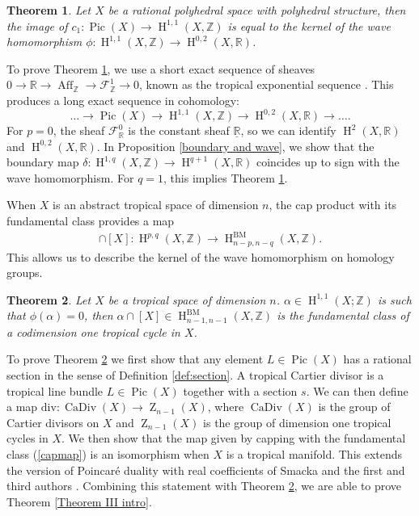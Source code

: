 \documentclass[11pt]{article}
\numberwithin{equation}{numsection}
\newcommand{\Z}{{\mathbb Z}}
\newcommand{\R}{{\mathbb R}}
\newcommand{\F}{{\mathcal F}}
\renewcommand{\div}{\mathrm{div}}
\DeclareMathOperator{\Pic}{Pic}
\DeclareMathOperator{\Aff}{Aff}
\DeclareMathOperator{\BM}{BM}
\DeclareMathOperator{\Div}{CaDiv}
\DeclareMathOperator{\HH}{H}
\DeclareMathOperator{\ZY}{Z}
\newtheorem{thm}{Theorem}[section]
\begin{document}
\begin{thm} \label{Theorem I intro}
Let $X$ be a  rational polyhedral space with polyhedral structure, then  the  image of $c_1 \colon \Pic(X) \rightarrow \HH^{1, 1}(X, \mathbb{Z})$ is equal to 
the kernel of the wave homomorphism 
$\phi \colon \HH^{1, 1}(X, \mathbb{Z})  \to \HH^{0,2}(X, \R)$. 
\end{thm}


To prove Theorem \ref{Theorem I intro},  we use a short exact sequence of sheaves $0 \to \R \to \Aff_{\Z} \to \F^1_{\Z} \to 0$, known as the tropical exponential sequence \cite{MikZha:Theta}. This produces a long exact sequence in cohomology: 
$$ \dots \to \Pic(X) \rightarrow \HH^{1, 1}(X, \mathbb{Z}) \to \HH^{0,2}(X, \R) \to \dots . $$
For $p = 0$, the sheaf $\mathcal{F}^0_{\R}$ is the constant sheaf $\underline{\R}$, 
so we can identify $\HH^{2}(X, \R)$ and $\HH^{0, 2}(X, \mathbb{R})$. 
In Proposition \ref{boundary and wave}, we show that the boundary map $\delta \colon  \HH^{1, q}(X, \mathbb{Z}) \to \HH^{q+1}(X, \R)$
coincides up to sign with the wave homomorphism. For $q=1$, this implies Theorem \ref{Theorem I intro}.


When $X$ is an abstract tropical space of dimension $n$, the cap product with its fundamental class provides  a map
\begin{align}\label{capmap}
\cap [X] \colon \HH^{p,q}(X, \Z) \to \HH^{\BM}_{n-p,n-q}(X, \Z).
\end{align}
This allows us to describe the kernel of the wave homomorphism on homology groups. 

\begin{thm} \label{Theorem II intro}
Let $X$ be a tropical space of dimension $n$. 
$\alpha \in \HH^{1, 1}(X; \mathbb{Z})$ is  such that $\phi(\alpha) = 0$, 
then $\alpha \cap [X] \in \HH^{\BM}_{n-1, n-1}(X, \Z)$ is the fundamental class of a codimension one tropical cycle in $X$. 
\end{thm}




To prove Theorem \ref{Theorem II intro} we first show that any element  
$L \in \Pic(X)$ has a rational  section in the sense of Definition \ref{def:section}. 
A tropical Cartier divisor is a tropical line bundle  $L \in \Pic(X)$ together with a section  $s$. 
We can then define a map  $\div \colon \Div(X) \to \ZY_{n-1}(X)$, where $\Div(X)$ is the group of Cartier divisors on $X$ and 
$\ZY_{n-1}(X)$ is the group of dimension one tropical cycles in $X$.  
We then show that the map given by capping with the fundamental class  (\ref{capmap})  is an isomorphism when $X$ is a tropical manifold. 
This extends the version of Poincar\'e duality with real coefficients  of  Smacka and the first and third authors \cite[Theorem 2]{JSS}. 
Combining this statement with Theorem \ref{Theorem II intro}, we are able to prove Theorem \ref{Theorem III intro}.
\end{document}
